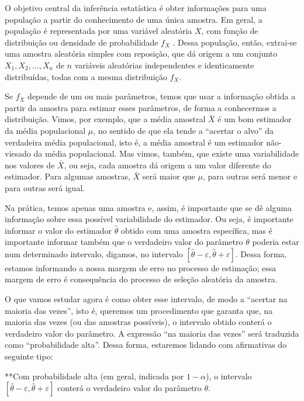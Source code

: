 \documentclass[
]{book}
\begin{document}
O objetivo central da inferência estatística é obter informações para uma população a partir do conhecimento de uma única amostra. Em geral, a população é representada por uma variável aleatória \(X\), com função de distribuição ou densidade de probabilidade \(f_X\) . Dessa população, então, extrai-se uma amostra aleatória simples com reposição, que dá origem a um conjunto \(X_1, X_2, \ldots, X_n\) de \(n\) variáveis aleatórias independentes e identicamente distribuídas, todas com a mesma distribuição \(f_X\).

Se \(f_X\) depende de um ou mais parâmetros, temos que usar a informação obtida a partir da amostra para estimar esses parâmetros, de forma a conhecermos a distribuição. Vimos, por exemplo, que a média amostral \(\bar X\) é um bom estimador da média populacional \(\mu\), no sentido de que ela tende a ``acertar o alvo'' da verdadeira média populacional, isto é, a média amostral é um estimador não-viesado da média populacional. Mas vimos, também, que existe uma variabilidade nos valores de \(\bar X\), ou seja, cada amostra dá origem a um valor diferente do estimador. Para algumas amostras, \(\bar X\) será maior que \(\mu\), para outras será menor e para outras será igual.

Na prática, temos apenas uma amostra e, assim, é importante que se dê alguma informação sobre essa possível variabilidade do estimador. Ou seja, é importante informar o valor do estimador \(\hat \theta\) obtido com uma amostra específica, mas é importante informar também que o verdadeiro valor do parâmetro \(\theta\) poderia estar num determinado intervalo, digamos, no intervalo \(\left[\hat\theta-\varepsilon,\hat\theta+\varepsilon\right]\). Dessa forma, estamos informando a nossa margem de erro no processo de estimação; essa margem de erro é consequência do processo de seleção aleatória da amostra.

O que vamos estudar agora é como obter esse intervalo, de modo a ``acertar na maioria das vezes'', isto é, queremos um procedimento que garanta que, na maioria das vezes (ou das amostras possíveis), o intervalo obtido conterá o verdadeiro valor do parâmetro. A expressão ``na maioria das vezes'' será traduzida como ``probabilidade alta''. Dessa forma, estaremos lidando com afirmativas do seguinte tipo:

**Com probabilidade alta (em geral, indicada por \(1-\alpha\)), o intervalo \(\left[\hat\theta-\varepsilon,\hat\theta+\varepsilon\right]\) conterá o verdadeiro valor do parâmetro \(\theta\).
\end{document}
